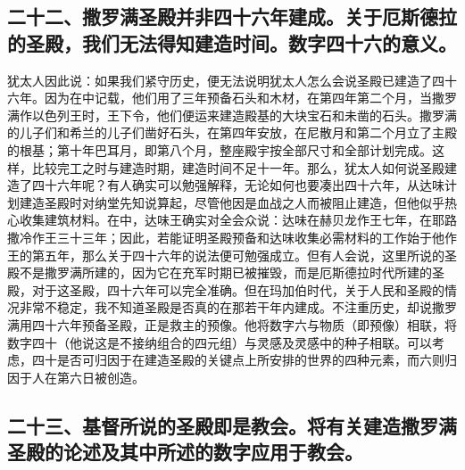 
\subsection{二十二、撒罗满圣殿并非四十六年建成。关于厄斯德拉的圣殿，我们无法得知建造时间。数字四十六的意义。}

犹太人因此说：如果我们紧守历史，便无法说明犹太人怎么会说圣殿已建造了四十六年。因为在中记载，他们用了三年预备石头和木材，在第四年第二个月，当撒罗满作以色列王时，王下令，他们便运来建造殿基的大块宝石和未凿的石头。撒罗满的儿子们和希兰的儿子们凿好石头，在第四年安放，在尼散月和第二个月立了主殿的根基；第十年巴耳月，即第八个月，整座殿宇按全部尺寸和全部计划完成。这样，比较完工之时与建造时期，建造时间不足十一年。那么，犹太人如何说圣殿建造了四十六年呢？有人确实可以勉强解释，无论如何也要凑出四十六年，从达味计划建造圣殿时对纳堂先知说算起，尽管他因是血战之人而被阻止建造，但他似乎热心收集建筑材料。在中，达味王确实对全会众说：达味在赫贝龙作王七年，在耶路撒冷作王三十三年；因此，若能证明圣殿预备和达味收集必需材料的工作始于他作王的第五年，那么关于四十六年的说法便可勉强成立。但有人会说，这里所说的圣殿不是撒罗满所建的，因为它在充军时期已被摧毁，而是厄斯德拉时代所建的圣殿，对于这圣殿，四十六年可以完全准确。但在玛加伯时代，关于人民和圣殿的情况非常不稳定，我不知道圣殿是否真的在那若干年内建成。不注重历史，却说撒罗满用四十六年预备圣殿，正是救主的预像。他将数字六与物质（即预像）相联，将数字四十（他说这是不接纳组合的四元组）与灵感及灵感中的种子相联。可以考虑，四十是否可归因于在建造圣殿的关键点上所安排的世界的四种元素，而六则归因于人在第六日被创造。\par


\subsection{二十三、基督所说的圣殿即是教会。将有关建造撒罗满圣殿的论述及其中所述的数字应用于教会。}


